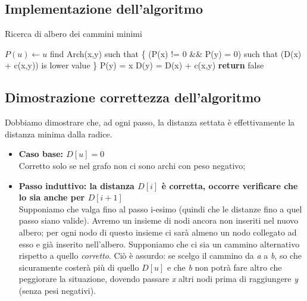 \subsection{Implementazione dell'algoritmo} \hfill
\begin{algorithm}
    \caption{Ricerca di albero dei cammini minimi}\label{alg:ACM}
    \begin{algorithmic}[1]
            \State $P(u) \gets u$  
                \State find Arch(x,y) such that \{
                \State (P(x) != 0 \&\& P(y) = 0) such that 
                \State (D(x) + c(x,y)) is lower value 
                \State \}
                \State P(y) = x
                \State D(y) = D(x) + c(x,y)
            \EndFor
            \State \textbf{return} false\Comment{}
        \EndFunction
    \end{algorithmic}
\end{algorithm}

\subsection{Dimostrazione correttezza dell'algoritmo}
Dobbiamo dimostrare che, ad ogni passo, la distanza settata è effettivamente la distanza minima dalla radice.
\begin{itemize}
    \item \textbf{Caso base: $ D[u] = 0 $} \\
        Corretto solo se nel grafo non ci sono archi con peso negativo;
    \item \textbf{Passo induttivo: la distanza $D[i]$ è corretta, occorre verificare che lo sia anche per $D[i+1]$} \\
        Supponiamo che valga fino al passo i-esimo (quindi che le distanze fino a quel passo siano valide). Avremo un insieme di nodi ancora non inseriti nel nuovo albero; per ogni nodo di questo insieme ci sarà almeno un nodo collegato ad esso e già inserito nell'albero. Supponiamo che ci sia un cammino alternativo rispetto a quello \textit{corretto}. Ciò è assurdo: se scelgo il cammino da \textit{a} a \textit{b}, so che sicuramente costerà più di quello $D[u]$ e che \textit{b} non potrà fare altro che peggiorare la situazione, dovendo passare \textit{x} altri nodi prima di raggiungere \textit{y} (senza pesi negativi).
\end{itemize}

